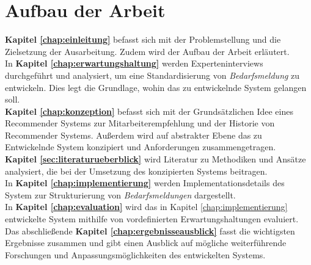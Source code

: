 \section{Aufbau der Arbeit}
\textbf{Kapitel \ref{chap:einleitung} } befasst sich mit der Problemstellung und die Zielsetzung der Ausarbeitung. Zudem wird der Aufbau der Arbeit erläutert.\\

In \textbf{Kapitel \ref{chap:erwartungshaltung} } werden Experteninterviews durchgeführt und analysiert, um eine Standardisierung von \emph{Bedarfsmeldung} zu entwickeln. Dies legt die Grundlage, wohin das zu entwickelnde System gelangen soll. \\

\textbf{Kapitel \ref{chap:konzeption} } befasst sich mit der Grundsätzlichen Idee eines Recommender Systems zur Mitarbeiterempfehlung und der Historie von Recommender Systems. Außerdem wird auf abstrakter Ebene das zu Entwickelnde System konzipiert und Anforderungen zusammengetragen.\\

\textbf{Kapitel \ref{sec:literaturueberblick} } wird Literatur zu Methodiken und Ansätze analysiert, die bei der Umsetzung des konzipierten Systems beitragen. \\

In \textbf{Kapitel \ref{chap:implementierung} } werden Implementationsdetails des System zur Strukturierung von \emph{Bedarfsmeldungen} dargestellt. \\

In \textbf{Kapitel \ref{chap:evaluation} } wird das in Kapitel \ref{chap:implementierung} entwickelte System mithilfe von vordefinierten Erwartungshaltungen evaluiert. \\

Das abschließende \textbf{Kapitel \ref{chap:ergebnisseausblick} } fasst die wichtigsten Ergebnisse zusammen und gibt einen Ausblick auf mögliche weiterführende Forschungen und Anpassungsmöglichkeiten des entwickelten Systems. \\
\newpage
